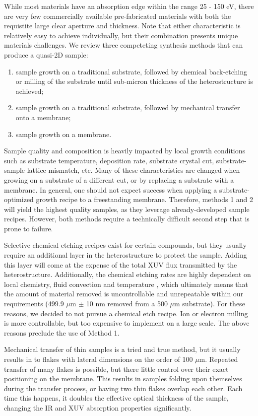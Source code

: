 While most materials have an absorption edge within the range 25 - 150 eV, there are very few commercially available pre-fabricated materials with both the requistite large clear aperture and thickness. Note that either characteristic is relatively easy to achieve individually, but their combination presents unique materials challenges. We review three competeting synthesis methods that can produce a quasi-2D sample:
\begin{enumerate}
	\item sample growth on a traditional substrate, followed by chemical back-etching or milling of the substrate until sub-micron thickness of the heterostructure is achieved;
	\item sample growth on a traditional substrate, followed by mechanical transfer onto a membrane;
	\item sample growth on a membrane.
\end{enumerate}
Sample quality and composition is heavily impacted by local growth conditions such as substrate temperature, deposition rate, substrate crystal cut, substrate-sample lattice mismatch, etc. Many of these characteristics are changed when growing on a substrate of a different cut, or by replacing a substrate with a membrane. In general, one should not expect success when applying a substrate-optimized growth recipe to a freestanding membrane. Therefore, methods 1 and 2 will yield the highest quality samples, as they leverage already-developed sample recipes. However, both methods require a technically difficult second step that is prone to failure.

Selective chemical etching recipes exist for certain compounds, but they usually require an additional layer in the heterostructure to protect the sample. Adding this layer will come at the expense of the total XUV flux transmitted by the heterostructure. Additionally, the chemical etching rates are highly dependent on local chemistry, fluid convection and temperature \cite{chiuPhotoluminescenceEvolutionGaAs2015}, which ultimately means that the amount of material removed is uncontrollable and unrepeatable within our requirements (499.9 $\mu$m $\pm$ 10 nm removed from a 500 $\mu$m substrate). For these reasons, we decided to not pursue a chemical etch recipe. Ion or electron milling is more controllable, but too expensive to implement on a large scale. The above reasons preclude the use of Method 1.

Mechanical transfer of thin samples is a tried and true method, but it usually results in to flakes with lateral dimensions on the order of 100 $\mu$m. Repeated transfer of many flakes is possible, but there little control over their exact positioning on the membrane. This results in samples folding upon themselves during the transfer process, or having two thin flakes overlap each other. Each time this happens, it doubles the effective optical thickness of the sample, changing the IR and XUV absorption properties significantly.


